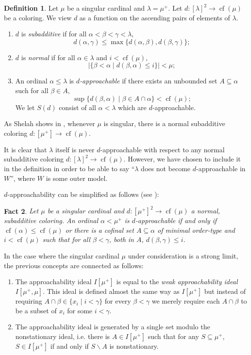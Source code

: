 \documentclass[a4paper]{amsart}
\theoremstyle{definition}
\newtheorem{mydef}{Definition}[section]
\theoremstyle{remark}
\theoremstyle{plain}
\newtheorem{myfact}[mydef]{Fact}
\numberwithin{mydef}{section}
\DeclareMathOperator{\cf}{cf}
\begin{document}
	\begin{mydef}
		Let $\mu$ be a singular cardinal and $\lambda=\mu^+$. Let $d\colon[\lambda]^2\to\cf(\mu)$ be a coloring. We view $d$ as a function on the ascending pairs of elements of $\lambda$.
		\begin{enumerate}
			\item $d$ is \emph{subadditive} if for all $\alpha<\beta<\gamma<\lambda$,
			$$d(\alpha,\gamma)\leq\max\{d(\alpha,\beta),d(\beta,\gamma)\};$$
			\item $d$ is \emph{normal} if for all $\alpha\in\lambda$ and $i<\cf(\mu)$,
			$$|\{\beta<\alpha\;|\;d(\beta,\alpha)\leq i\}|<\mu;$$
			\item An ordinal $\alpha\leq\lambda$ is \emph{$d$-approachable} if there exists an unbounded set $A\subseteq\alpha$ such for all $\beta\in A$,
			$$\sup\{d(\beta,\alpha)\;|\;\beta\in A\cap\alpha\}<\cf(\mu);$$
			We let $S(d)$ consist of all $\alpha<\lambda$ which are $d$-approachable.
		\end{enumerate}
	\end{mydef}
	
	As Shelah shows in \cite{ShelahSuccSingCard}, whenever $\mu$ is singular, there is a normal subadditive coloring $d\colon[\mu^+]\to\cf(\mu)$.
	
	It is clear that $\lambda$ itself is never $d$-approachable with respect to any normal subadditive coloring $d\colon[\lambda]^2\to\cf(\mu)$. However, we have chosen to include it in the definition in order to be able to say ``$\lambda$ does not become $d$-approachable in $W$'', where $W$ is some outer model.
	
	$d$-approachability can be simplified as follows (see \cite[Corollary 3.27]{EisworthHandbook}):
	
	\begin{myfact}
		Let $\mu$ be a singular cardinal and $d\colon[\mu^+]^2\to\cf(\mu)$ a normal, subadditive coloring. An ordinal $\alpha<\mu^+$ is $d$-approachable if and only if $\cf(\alpha)\leq\cf(\mu)$ or there is a cofinal set $A\subseteq\alpha$ of minimal order-type and $i<\cf(\mu)$ such that for all $\beta<\gamma$, both in $A$, $d(\beta,\gamma)\leq i$.
	\end{myfact}
	
	In the case where the singular cardinal $\mu$ under consideration is a strong limit, the previous concepts are connected as follows:
	
	\begin{enumerate}
		\item The approachability ideal $I[\mu^+]$ is equal to the \emph{weak approachability ideal} $I[\mu^+,\mu]$. This ideal is defined almost the same way as $I[\mu^+]$ but instead of requiring $A\cap\beta\in\{x_i\;|\;i<\gamma\}$ for every $\beta<\gamma$ we merely require each $A\cap\beta$ to be a subset of $x_i$ for some $i<\gamma$.
		\item The approachability ideal is generated by a single set modulo the nonstationary ideal, i.e. there is $A\in I[\mu^+]$ such that for any $S\subseteq\mu^+$, $S\in I[\mu^+]$ if and only if $S\smallsetminus A$ is nonstationary.
	\end{enumerate}
	
\end{document}
